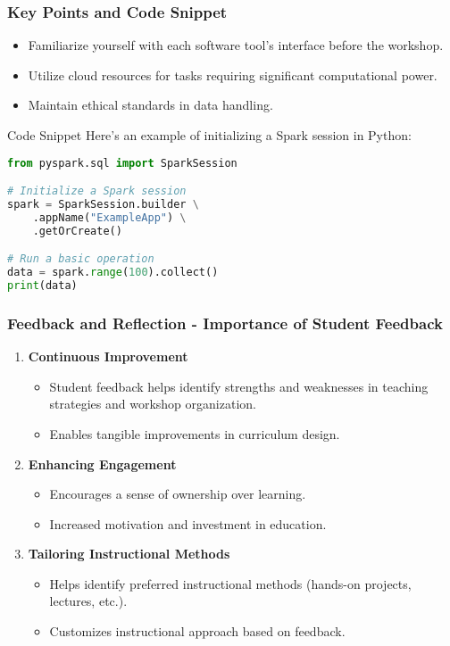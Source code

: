 \documentclass[aspectratio=169]{beamer}
\begin{document}
\begin{frame}[fragile]
    \frametitle{Key Points and Code Snippet}
    \begin{itemize}
        \item Familiarize yourself with each software tool's interface before the workshop.
        \item Utilize cloud resources for tasks requiring significant computational power.
        \item Maintain ethical standards in data handling.
    \end{itemize}
    
    \begin{block}{Code Snippet}
    Here's an example of initializing a Spark session in Python:
    \begin{lstlisting}[language=Python]
from pyspark.sql import SparkSession

# Initialize a Spark session
spark = SparkSession.builder \
    .appName("ExampleApp") \
    .getOrCreate()

# Run a basic operation
data = spark.range(100).collect()
print(data)
    \end{lstlisting}
    \end{block}    
\end{frame}

\begin{frame}[fragile]
    \frametitle{Feedback and Reflection - Importance of Student Feedback}
    \begin{enumerate}
        \item \textbf{Continuous Improvement}
        \begin{itemize}
            \item Student feedback helps identify strengths and weaknesses in teaching strategies and workshop organization.
            \item Enables tangible improvements in curriculum design.
        \end{itemize}
        
        \item \textbf{Enhancing Engagement}
        \begin{itemize}
            \item Encourages a sense of ownership over learning.
            \item Increased motivation and investment in education.
        \end{itemize}
        
        \item \textbf{Tailoring Instructional Methods}
        \begin{itemize}
            \item Helps identify preferred instructional methods (hands-on projects, lectures, etc.).
            \item Customizes instructional approach based on feedback.
        \end{itemize}
    \end{enumerate}
\end{frame}
\end{document}
